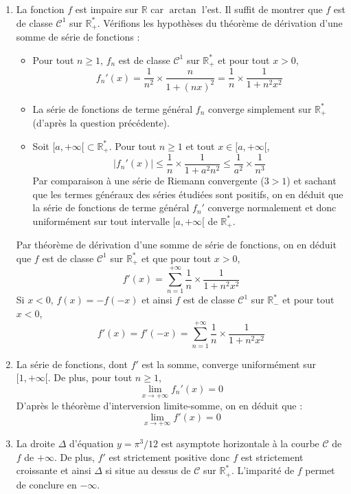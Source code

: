 \documentclass[a4paper,twoside,french,11pt]{VcCours}
\begin{document}
\begin{enumerate}
\item La fonction $f$ est impaire sur $\mathbb{R}$ car $\arctan$ l'est. Il suffit de montrer que $f$ est de classe $\mathcal{C}^1$ sur $\mathbb{R}_+^{*}$. Vérifions les hypothèses du théorème de dérivation d'une somme de série de fonctions :
\begin{itemize}
\item Pour tout $n \geq 1$, $f_n$ est de classe $\mathcal{C}^1$ sur $\mathbb{R}_+^{*}$ et pour tout $x>0$,
$$ f_n'(x) = \dfrac{1}{n^2} \times \dfrac{n}{1+(nx)^2} = \dfrac{1}{n} \times \dfrac{1}{1+n^2x^2}$$
\item La série de fonctions de terme général $f_n$ converge simplement sur $\mathbb{R}_+^{*}$ (d'après la question précédente).
\item Soit $[a, + \infty[ \subset \mathbb{R}_+^{*}$. Pour tout $n \geq 1$ et tout $x \in [a, + \infty[$,
$$ \vert f_n'(x) \vert \leq \dfrac{1}{n} \times \dfrac{1}{1+a^2n^2} \leq \dfrac{1}{a^2} \times \dfrac{1}{n^3}$$
Par comparaison à une série de Riemann convergente ($3>1$) et sachant que les termes généraux des séries étudiées sont positifs, on en déduit que la série de fonctions de terme général $f_n'$ converge normalement et donc uniformément sur tout intervalle $[a,+ \infty[$ de $\mathbb{R}_+^{*}$.
\end{itemize}
Par théorème de dérivation d'une somme de série de fonctions, on en déduit que $f$ est de classe $\mathcal{C}^1$ sur $\mathbb{R}_+^{*}$ et que pour tout $x>0$,
$$ f'(x) = \sum_{n=1}^{+ \infty} \dfrac{1}{n} \times \dfrac{1}{1+n^2x^2}$$
Si $x<0$, $f(x)=-f(-x)$ et ainsi $f$ est de classe $\mathcal{C}^1$ sur $\mathbb{R}_{-}^*$ et pour tout $x<0$,
$$ f'(x)=f'(-x) = \sum_{n=1}^{+ \infty} \dfrac{1}{n} \times \dfrac{1}{1+n^2x^2}$$
\item La série de fonctions, dont $f'$ est la somme, converge uniformément sur $[1, + \infty[$. De plus, pour tout $n \geq 1$,
$$ \lim_{x \rightarrow + \infty} f_n'(x) = 0$$
D'après le théorème d'interversion limite-somme, on en déduit que :
$$ \lim_{x \rightarrow + \infty} f'(x) = 0$$
\item La droite $\Delta$ d'équation $y= \pi^3/12$ est asymptote horizontale à la courbe $\mathcal{C}$ de $f$ de $+ \infty$. De plus, $f'$ est strictement positive donc $f$ est strictement croissante et ainsi $\Delta$ si situe au dessus de $\mathcal{C}$ sur $\mathbb{R}_+^{*}$. L'imparité de $f$ permet de conclure en $- \infty$.
\end{enumerate}

\medskip
\end{document}
